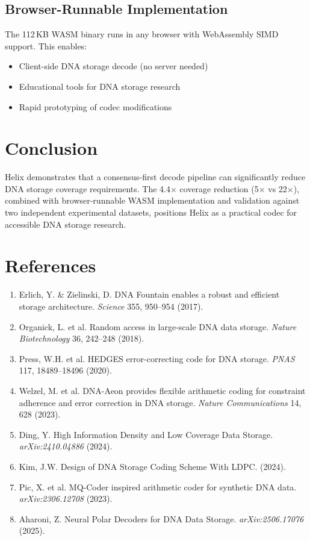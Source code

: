 \documentclass[11pt,a4paper]{article}
\begin{document}
\subsection{Browser-Runnable Implementation}

The 112\,KB WASM binary runs in any browser with WebAssembly SIMD support. This enables:
\begin{itemize}[noitemsep]
\item Client-side DNA storage decode (no server needed)
\item Educational tools for DNA storage research
\item Rapid prototyping of codec modifications
\end{itemize}

\section{Conclusion}

Helix demonstrates that a consensus-first decode pipeline can significantly reduce DNA storage coverage requirements. The 4.4$\times$ coverage reduction (5$\times$ vs 22$\times$), combined with browser-runnable WASM implementation and validation against two independent experimental datasets, positions Helix as a practical codec for accessible DNA storage research.

\section*{References}

\begin{enumerate}[noitemsep]
\item Erlich, Y. \& Zielinski, D. DNA Fountain enables a robust and efficient storage architecture. \textit{Science} 355, 950--954 (2017).
\item Organick, L. et al. Random access in large-scale DNA data storage. \textit{Nature Biotechnology} 36, 242--248 (2018).
\item Press, W.H. et al. HEDGES error-correcting code for DNA storage. \textit{PNAS} 117, 18489--18496 (2020).
\item Welzel, M. et al. DNA-Aeon provides flexible arithmetic coding for constraint adherence and error correction in DNA storage. \textit{Nature Communications} 14, 628 (2023).
\item Ding, Y. High Information Density and Low Coverage Data Storage. \textit{arXiv:2410.04886} (2024).
\item Kim, J.W. Design of DNA Storage Coding Scheme With LDPC. (2024).
\item Pic, X. et al. MQ-Coder inspired arithmetic coder for synthetic DNA data. \textit{arXiv:2306.12708} (2023).
\item Aharoni, Z. Neural Polar Decoders for DNA Data Storage. \textit{arXiv:2506.17076} (2025).
\end{enumerate}
\end{document}

